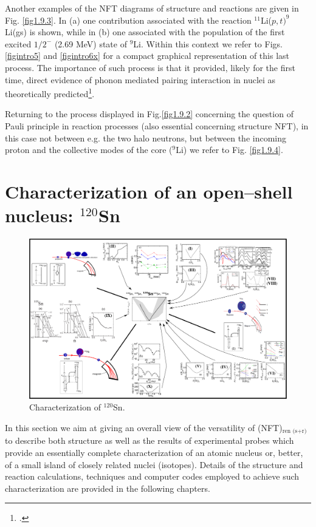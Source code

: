 Another examples of the NFT diagrams of structure and reactions are given in Fig. \ref{fig1.9.3}. In (a) one contribution associated with the reaction $^{11}$Li($p,t)^9$Li(gs) is shown, while in (b) one associated with the population of the first excited $1/2^-$ (2.69 MeV) state of $^9$Li. Within this context we refer to Figs. \ref{figintro5} and \ref{figintro6x}   for a compact graphical representation of this last process. The importance of such process is that it provided, likely for the first time, direct evidence of phonon mediated pairing interaction in nuclei as theoretically predicted\footnote{\cite{Barranco:01} \cite{Tanihata:08,Potel:10,Tanihata:13,Beceiro:15}.}.

          Returning to the process displayed in Fig.\ref{fig1.9.2} concerning the question of Pauli principle in reaction processes (also essential concerning structure NFT), in this case
          not between e.g. the two halo neutrons, but between the incoming proton and the collective modes
          of the core ($^9$Li) we refer to Fig. \ref{fig1.9.4}. 
          
          
\section{Characterization of an open--shell nucleus: $^{120}$Sn}\label{S1.10}
          \begin{figure}
          \centerline {
          \includegraphics*[width=24cm, angle=90]{introduccion/figs/fig1_4_1v2}}
          \caption{Characterization of $^{120}$Sn.}
          \label{fig1.4.1}
          \end{figure}
          In this section we aim at giving an overall view of
the versatility of (NFT)$_{\text{ren (s+r)}}$ to describe both structure as well as the results of experimental probes which provide an essentially complete characterization of an atomic nucleus or, better, of a small island of closely related nuclei (isotopes). Details of the structure and reaction calculations, techniques and computer codes employed to achieve such characterization are provided in the following chapters. 

